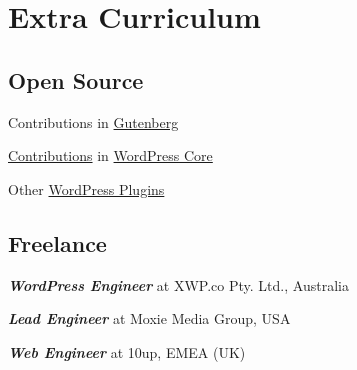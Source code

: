 \documentclass[]{deedy-resume-openfont}
\begin{document}
\begin{minipage}[t]{0.33\textwidth}

\section{Extra Curriculum}

\subsection{Open Source}
\vspace{\topsep} %
\begin{tightemize}
\item
  Contributions in
  \href{https://github.com/WordPress/gutenberg/pulls?q=is\%3Apr+author\%3Adesaiuditd}{Gutenberg}
\item
  \href{https://core.trac.wordpress.org/report/25?USER=desaiuditd}{Contributions} in
  \href{https://github.com/WordPress/wordpress-develop/pulls?q=is\%3Apr+author\%3Adesaiuditd}{WordPress Core}
\item
  Other \href{https://profiles.wordpress.org/desaiuditd/#content-plugins}{WordPress Plugins}
\end{tightemize}
\sectionsep


\subsection{Freelance}
\begin{tightemize}
\item \textbf{\textit{WordPress Engineer}} at XWP.co Pty. Ltd., Australia
\end{tightemize}
\begin{tightemize}
\item \textbf{\textit{Lead Engineer}} at Moxie Media Group, USA
\end{tightemize}
\begin{tightemize}
\item \textbf{\textit{Web Engineer}} at 10up, EMEA (UK)
\end{tightemize}
\sectionsep


\end{minipage}
\end{document}

